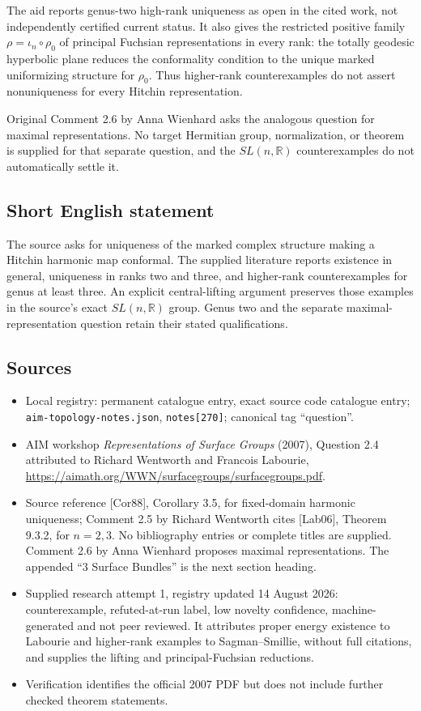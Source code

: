 \documentclass[11pt]{article}
\newcommand{\R}{\mathbb{R}}
\begin{document}
The aid reports genus-two high-rank uniqueness as open in the cited work, not independently certified current status. It also gives the restricted positive family $\rho=\iota_n\circ\rho_0$ of principal Fuchsian representations in every rank: the totally geodesic hyperbolic plane reduces the conformality condition to the unique marked uniformizing structure for $\rho_0$. Thus higher-rank counterexamples do not assert nonuniqueness for every Hitchin representation.

Original Comment 2.6 by Anna Wienhard asks the analogous question for maximal representations. No target Hermitian group, normalization, or theorem is supplied for that separate question, and the $SL(n,\R)$ counterexamples do not automatically settle it.
\subsection{Short English statement}
The source asks for uniqueness of the marked complex structure making a Hitchin harmonic map conformal. The supplied literature reports existence in general, uniqueness in ranks two and three, and higher-rank counterexamples for genus at least three. An explicit central-lifting argument preserves those examples in the source's exact $SL(n,\R)$ group. Genus two and the separate maximal-representation question retain their stated qualifications.
\subsection{Sources}
\begin{itemize}
\item Local registry: permanent catalogue entry, exact source code catalogue entry; \texttt{aim-topology-notes.json}, \texttt{notes[270]}; canonical tag ``question''.
\item AIM workshop \emph{Representations of Surface Groups} (2007), Question 2.4 attributed to Richard Wentworth and Francois Labourie, \url{https://aimath.org/WWN/surfacegroups/surfacegroups.pdf}.
\item Source reference [Cor88], Corollary 3.5, for fixed-domain harmonic uniqueness; Comment 2.5 by Richard Wentworth cites [Lab06], Theorem 9.3.2, for $n=2,3$. No bibliography entries or complete titles are supplied. Comment 2.6 by Anna Wienhard proposes maximal representations. The appended ``3 Surface Bundles'' is the next section heading.
\item Supplied research attempt 1, registry updated 14 August 2026: counterexample, refuted-at-run label, low novelty confidence, machine-generated and not peer reviewed. It attributes proper energy existence to Labourie and higher-rank examples to Sagman--Smillie, without full citations, and supplies the lifting and principal-Fuchsian reductions.
\item Verification identifies the official 2007 PDF but does not include further checked theorem statements.
\end{itemize}
\end{document}
